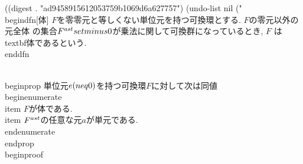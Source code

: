 
((digest . "ad9458915612053759b1069d6a627757") (undo-list nil ("
\\begin{dfn}[体]
 $F$を零零元と等しくない単位元を持つ可換環とする. $F$の零元以外の元全体
 の集合$F^{\\ast}\\setminus\\{0\\}$が乗法に関して可換群になっているとき, $F$
 は\\textbf{体}であるという. 
\\end{dfn}

\\begin{prop}
 単位元$e(\\neq0)$を持つ可換環$F$に対して次は同値
 \\begin{enumerate}
  \\item $F$が体である. 
  \\item $F^{\\ast}$の任意な元$a$が単元である. 
 \\end{enumerate}
\\end{prop}
\\begin{proof}
 
